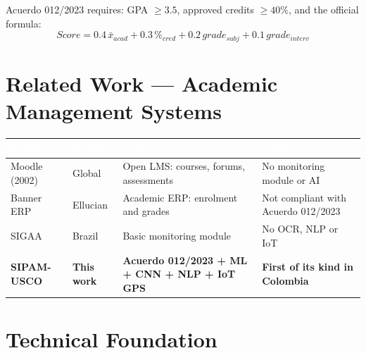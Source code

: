 \documentclass[12pt,a4paper,twoside]{report}
\begin{document}
Acuerdo 012/2023 requires: GPA $\geq 3.5$, approved credits $\geq 40\%$, and the official formula:
\begin{equation}
\boxed{Score = 0.4\,\bar{x}_{acad} + 0.3\,\%_{cred} + 0.2\,grade_{subj} + 0.1\,grade_{interv}}
\end{equation}

\section{Related Work — Academic Management Systems}

\begin{center}
\begin{tabularx}{\textwidth}{|l|l|X|p{3cm}|}
\hline
\rowcolor{tableHdr}
\textcolor{white}{\textbf{System}} &
\textcolor{white}{\textbf{Origin}} &
\textcolor{white}{\textbf{Features}} &
\textcolor{white}{\textbf{Limitation}} \\
\hline
\rowcolor{rowOdd}Moodle (2002) & Global & Open LMS: courses, forums, assessments & No monitoring module or AI \\
\hline
\rowcolor{rowEven}Banner ERP & Ellucian & Academic ERP: enrolment and grades & Not compliant with Acuerdo 012/2023 \\
\hline
\rowcolor{rowOdd}SIGAA & Brazil & Basic monitoring module & No OCR, NLP or IoT \\
\hline
\rowcolor{rowEven}\textbf{SIPAM-USCO} & \textbf{This work} & \textbf{Acuerdo 012/2023 + ML + CNN + NLP + IoT GPS} & \textbf{First of its kind in Colombia} \\
\hline
\end{tabularx}
\end{center}

\section{Technical Foundation}
\end{document}
